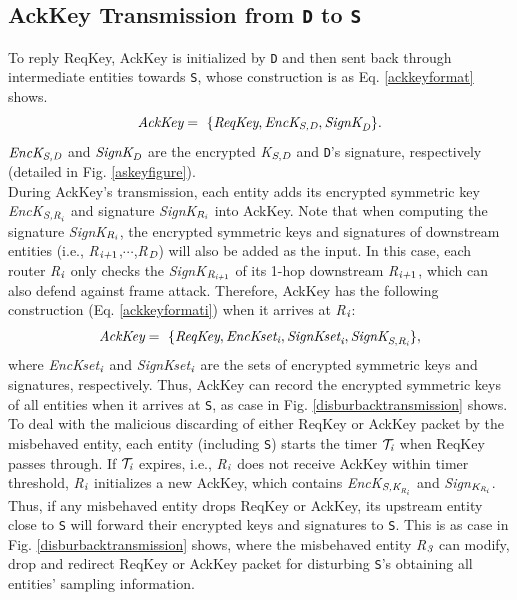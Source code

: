 \subsection{AckKey Transmission from {\tt D} to {\tt S}}
\label{ackkeytransmission}
To reply ReqKey, AckKey is initialized by {\tt D} and then sent back through intermediate entities towards {\tt S}, whose construction is as Eq. \ref{ackkeyformat} shows.
\begin{equation}\label{ackkeyformat}
\emph{AckKey} =~ \{\emph{ReqKey}, \emph{EncK}_{\emph{S,D}}, \emph{SignK}_\emph{D}\}.
\end{equation}
\noindent
$\emph{EncK}_{\emph{S,D}}$ and $\emph{SignK}_\emph{D}$ are the encrypted \emph{K}$_{\emph{S},\emph{D}}$ and {\tt D}'s signature, respectively (detailed in Fig. \ref{askeyfigure}).\\
\indent
During AckKey's transmission, each entity adds its encrypted symmetric key \emph{EncK}$_{\emph{S,R}_\emph{i}}$ and signature \emph{SignK}$_{\emph{R}_\emph{i}}$ into AckKey. Note that when computing the signature \emph{SignK}$_{\emph{R}_\emph{i}}$, the encrypted symmetric keys and signatures of downstream entities (i.e., \emph{R}$_{\emph{i+}1}$,$\cdots$,\emph{R}$_\emph{D}$) will also be added as the input. In this case, each router \emph{R}$_\emph{i}$ only checks the \emph{SignK}$_{\emph{R}_{\emph{i+}1}}$ of its 1-hop downstream \emph{R}$_{\emph{i+}1}$, which can also defend against frame attack. Therefore, AckKey has the following construction (Eq. \ref{ackkeyformati}) when it arrives at \emph{R}$_\emph{i}$:\\
\begin{equation}\label{ackkeyformati}
\emph{AckKey} =~ \{\emph{ReqKey}, \emph{EncKset}_{\emph{i}}, \emph{SignKset}_\emph{i}, \emph{SignK}_{\emph{S},\emph{R}_\emph{i}}\},
\end{equation}
\noindent where \emph{EncKset}$_\emph{i}$ and \emph{SignKset}$_\emph{i}$ are the sets of encrypted symmetric keys and signatures, respectively. Thus, AckKey can record the encrypted symmetric keys of all entities when it arrives at {\tt S}, as case \uppercase\expandafter{} in Fig. \ref{disburbacktransmission} shows.\\
\indent To deal with the malicious discarding of either ReqKey or AckKey packet by the misbehaved entity, each entity (including {\tt S}) starts the timer $\mathcal{T}_\emph{i}$ when ReqKey passes through. If $\mathcal{T}_\emph{i}$ expires, i.e., \emph{R}$_\emph{i}$ does not receive AckKey within timer threshold, \emph{R}$_\emph{i}$ initializes a new AckKey, which contains \emph{EncK}$_{\emph{S,K}_{\emph{R}_\emph{i}}}$ and \emph{Sign}$_{\emph{K}_{\emph{R}_\emph{i}}}$. Thus, if any misbehaved entity drops ReqKey or AckKey, its upstream entity close to {\tt S} will forward their encrypted keys and signatures to {\tt S}. This is as case \uppercase\expandafter{} in Fig. \ref{disburbacktransmission} shows, where the misbehaved entity \emph{R}$_\emph{3}$ can modify, drop and redirect ReqKey or AckKey packet for disturbing {\tt S}'s obtaining all entities' sampling information.

